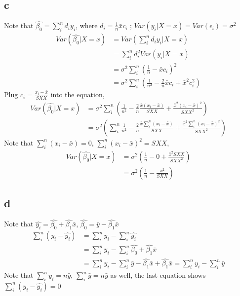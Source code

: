 \documentclass[11pt,letterpaper]{article}
\begin{document}
\subsection*{c}
\noindent Note that $\hat{\beta_0} = \sum_i^n d_i y_i$, where $d_i =  \frac{1}{n} \bar{x} c_i$ ; $Var(y_i | X = x) = Var(\epsilon_i) = \sigma^2$
\begin{align*}
Var(\hat{\beta_0} | X=x) &= Var(\sum_i^n d_i y_i | X=x) \\
&= \sum_i^n d_i^2 Var(y_i | X=x) \\
&= \sigma^2 \sum_i^n (\frac{1}{n} - \bar{x} c_i)^2 \\
&= \sigma^2 \sum_i^n (\frac{1}{n^2} - \frac{2}{n} \bar{x} c_i + \bar{x}^2 c_i^2 )
\end{align*}
\noindent Plug $c_i = \frac{x_i - \bar{x}}{SXX}$ into the equation,
\begin{align*}
Var(\hat{\beta_0} | X=x) &= \sigma^2 \sum_i^n (\frac{1}{n^2} - \frac{2}{n}  \frac{\bar{x} (x_i - \bar{x})}{SXX} + \frac{\bar{x}^2 (x_i - \bar{x})^2} {SXX^2} )\\
&= \sigma^2 (\sum_i^n \frac{1}{n^2} - \frac{2}{n}  \frac{\bar{x} \sum_i^n (x_i - \bar{x})}{SXX} + \frac{\bar{x}^2  \sum_i^n (x_i - \bar{x})^2}{SXX^2} )
\end{align*}
\noindent Note that $\sum_i^n (x_i - \bar{x}) = 0$, $\sum_i^n (x_i - \bar{x})^2 = SXX$,
\begin{align*}
Var(\hat{\beta_0} | X=x) &=\sigma^2 (\frac{1}{n} - 0 + \frac{\bar{x}^2  SXX}{SXX^2} ) \\
&= \sigma^2 (\frac{1}{n} - \frac{x^2}{SXX})
\end{align*}

\subsection*{d}
\noindent Note that $\hat{y_i} = \hat{\beta_0} + \hat{\beta_1} \bar{x}$, $\hat{\beta_0} = \bar{y} - \hat{\beta_1} \bar{x}$
\begin{align*}
\sum_i^n (y_i - \hat{y_i}) &= \sum_i^n y_i - \sum_i^n \hat{y_i} \\
&= \sum_i^n y_i - \sum_i^n \hat{\beta_0} + \hat{\beta_1} \bar{x} \\
&= \sum_i^n y_i - \sum_i^n \bar{y} - \hat{\beta_1} \bar{x} + \hat{\beta_1} \bar{x} = \sum_i^n y_i - \sum_i^n \bar{y}
\end{align*}
\noindent Note that $\sum_i^n y_i = n \bar{y}$, $\sum_i^n \bar{y} = n \bar{y}$ as well, the last equation shows $\sum_i^n (y_i - \hat{y_i}) = 0$
\end{document}
